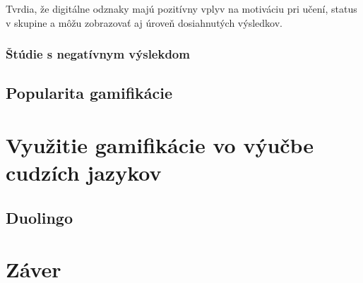 \documentclass[10pt,oneside,slovak,a4paper]{article}
\begin{document}
Tvrdia, že digitálne odznaky majú pozitívny vplyv na motiváciu pri učení, status v skupine a môžu zobrazovať aj úroveň dosiahnutých výsledkov. ~\cite{gibson2015digital}

\subsubsection{Štúdie s negatívnym výslekdom} \label{negat}
\subsection{Popularita gamifikácie}
\section{Využitie gamifikácie vo výučbe cudzích jazykov} \label{use}
\subsection{Duolingo} \label{duolingo}

\section{Záver} \label{zaver}


\end{document}
